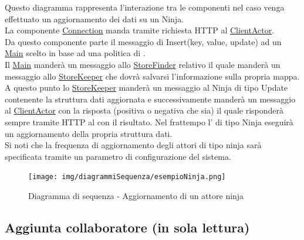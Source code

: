 \documentclass{scalatekids-article}
\begin{document}
Questo diagramma rappresenta l'interazione tra le componenti nel caso venga
effettuato un aggiornamento dei dati su un  Ninja.\\
La componente \hyperref[sec:actorbase::driver::client::Connection]{Connection}
manda tramite richiesta HTTP al \hyperref[sec:actorbase::actorsystem::clientactor::ClientActor]{ClientActor}.\\
Da questo componente parte il messaggio di Insert(key, value, update) ad un \hyperref[sec:actorbase::actorsystem::main::Main]{Main}
scelto in base ad una politica di .\\
Il \hyperref[sec:actorbase::actorsystem::main::Main]{Main} manderà un messaggio allo
\hyperref[sec:actorbase::actorsystem::storefinder::Storefinder]{StoreFinder} relativo il quale manderà un messaggio
allo \hyperref[sec:actorbase::actorsystem::storekeeper::Storekeeper]{StoreKeeper} che dovrà salvarsi l'informazione sulla propria mappa.\\
A questo punto lo \hyperref[sec:actorbase::actorsystem::storekeeper::Storekeeper]{StoreKeeper} manderà un messaggio al Ninja di tipo
Update contenente la struttura dati aggiornata e successivamente manderà un messaggio al
\hyperref[sec:actorbase::actorsystem::clientactor::ClientActor]{ClientActor} con la risposta (positiva o negativa che sia)
il quale risponderà sempre tramite HTTP al  con il risultato.
Nel frattempo l' di tipo Ninja eseguirà un aggiornamento della propria struttura dati.\\
Si noti che la frequenza di aggiornamento degli attori di tipo ninja sarà
specificata tramite un parametro di configurazione del sistema.
\begin{figure}[H]
  \begin{center}
    \texttt{[image: img/diagrammiSequenza/esempioNinja.png]}
    \caption{Diagramma di sequenza - Aggiornamento di un attore ninja}
  \end{center}
\end{figure}

\subsection{Aggiunta collaboratore (in sola lettura)}
\end{document}
